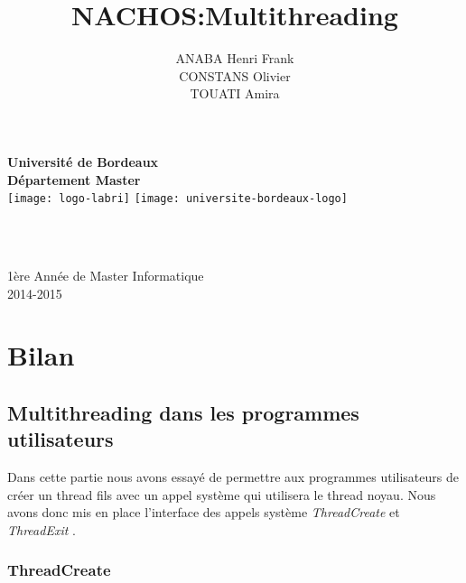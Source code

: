\documentclass[12pt, a4paper]{report}
\title{NACHOS:Multithreading}
\author{
	ANABA Henri Frank\\
	CONSTANS Olivier\\
	TOUATI Amira
	}
\begin{document}
\makeatletter
  \begin{titlepage}
  \centering
      {\large\textbf{	Université de Bordeaux\\
       Département Master}}\\
      \texttt{[image: logo-labri]}
      \hfill
      \texttt{[image: universite-bordeaux-logo]}\\
    \vspace{4cm}
      
       {\LARGE \textbf{\@title}} \\
    \vspace{2cm}
   
    \vspace{4em}
        {\large \@author} \\
    \vfill
    	{\large 1ère Année de Master Informatique}\\
    	{\large \textsc{2014-2015}}\\
    
    \end{titlepage}


\tableofcontents



\chapter{Bilan}


\section{Multithreading dans les programmes utilisateurs}

Dans cette partie nous avons essayé de permettre aux programmes utilisateurs de créer un thread fils avec un appel système qui utilisera le thread noyau. Nous avons donc mis en place l'interface des appels système  \textit{ ThreadCreate } et \textit{ ThreadExit }.
\subsection{ThreadCreate }
\end{document}
